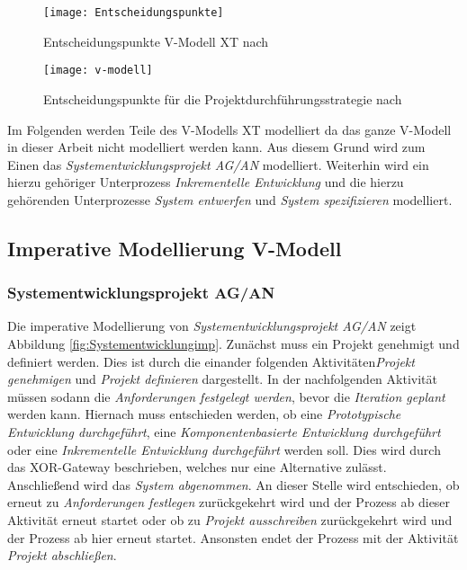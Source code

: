  
 
 \begin{figure}[!htbp]
\begin{center}
  \texttt{[image: Entscheidungspunkte]} %
  \caption{Entscheidungspunkte V-Modell XT nach \cite{2004vmodell}}
  \label{fig:entscheidungspunkte}
\end{center}
\end{figure}
 
\begin{sidewaysfigure}[!htbp]
\begin{center}
  \texttt{[image: v-modell]} %
  \caption{Entscheidungspunkte für die Projektdurchführungsstrategie nach \cite{2004vmodell}}
  \label{fig:v-modell}
\end{center}
\end{sidewaysfigure}

Im Folgenden werden Teile des V-Modells XT modelliert da das ganze V-Modell in dieser Arbeit nicht  modelliert werden kann. Aus diesem Grund wird zum Einen das \textit{Systementwicklungsprojekt AG/AN} modelliert. Weiterhin wird ein hierzu gehöriger Unterprozess \textit{Inkrementelle Entwicklung} und die hierzu gehörenden Unterprozesse \textit{System entwerfen} und \textit{System spezifizieren} modelliert.
\clearpage

\subsection{Imperative Modellierung V-Modell}



\subsubsection{Systementwicklungsprojekt AG/AN}


Die imperative Modellierung von \textit{Systementwicklungsprojekt AG/AN}  zeigt Abbildung \ref{fig:Systementwicklungimp}. \newline
Zunächst muss ein Projekt genehmigt und definiert werden. Dies ist durch die einander folgenden Aktivitäten\textit{Projekt genehmigen} und \textit{Projekt definieren} dargestellt.\newline
In der nachfolgenden Aktivität müssen sodann die \textit{Anforderungen festgelegt werden}, bevor die \textit{Iteration geplant} werden kann. \newline
Hiernach muss entschieden werden, ob eine \textit{Prototypische Entwicklung durchgeführt}, eine \textit{Komponentenbasierte Entwicklung durchgeführt} oder eine \textit{Inkrementelle Entwicklung durchgeführt} werden soll. Dies wird durch das XOR-Gateway beschrieben, welches nur eine Alternative zulässt.\newline
Anschließend wird das \textit{System abgenommen}.\newline
An dieser Stelle wird entschieden, ob erneut zu \textit{Anforderungen festlegen} zurückgekehrt wird und der Prozess ab dieser Aktivität erneut startet oder ob zu \textit{Projekt ausschreiben} zurückgekehrt wird und der Prozess ab hier erneut startet. Ansonsten endet der Prozess mit der Aktivität \textit{Projekt abschließen}.


